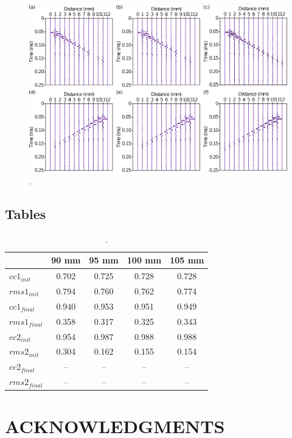 \documentclass[manuscript,revised]{geophysics}
\begin{document}
\begin{figure}[!h]
	\centering
	\includegraphics[scale=0.4,angle=90]{fig/panel_lswe_all_comp.eps}
	\caption{.}
	\label{panel_srcest_2d_mean_comp}
\end{figure}

\clearpage
\newpage

\subsection*{Tables}

\begin{table}[!ht]
	\centering
	\begin{tabular}{lcccc}
		\hline
		\qquad & 90 mm & 95 mm & 100 mm & 105 mm \\
		\hline
		$cc1_{init}$  & 0.702 & 0.725 & 0.728 & 0.728 \\
		$rms1_{init}$ & 0.794 & 0.760 & 0.762 & 0.774 \\
		\hline
		$cc1_{final}$  & 0.940 & 0.953 & 0.951 & 0.949 \\
		$rms1_{final}$ & 0.358 & 0.317 & 0.325 & 0.343 \\
		\hline
		\hline
		$cc2_{init}$  & 0.954 & 0.987 & 0.988 & 0.988 \\
		$rms2_{init}$ & 0.304 & 0.162 & 0.155 & 0.154 \\
		\hline
		$cc2_{final}$  & --   & --    & --    & --    \\
		$rms2_{final}$ & --   & --    & --    & --    \\
		\hline
	\end{tabular}
	\caption{.}
	\label{cc-rms}
\end{table}

\clearpage
\newpage 

\section{ACKNOWLEDGMENTS}

\clearpage
\newpage

%

\end{document}
